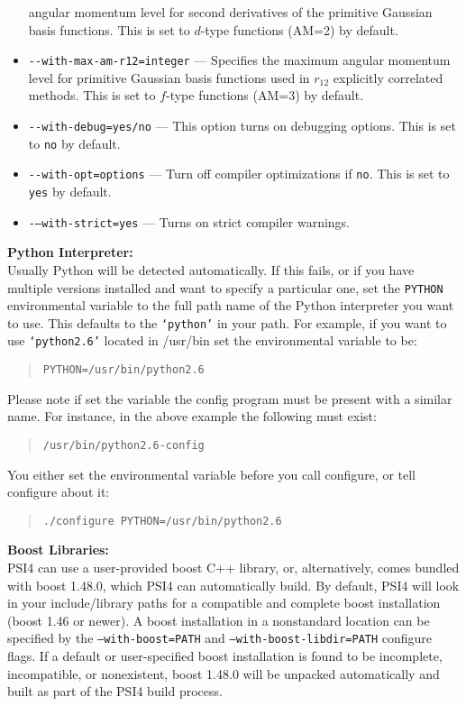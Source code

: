 \documentclass[12pt]{article}
\begin{document}
\begin{itemize}
  angular momentum level for second derivatives of the primitive
  Gaussian basis functions.  This is set to $d$-type functions (AM=2)
  by default.
\item {\tt -}{\tt -with-max-am-r12=integer} --- Specifies the maximum
  angular momentum level for primitive Gaussian basis functions used
  in $r_{12}$ explicitly correlated methods.  This is set to $f$-type
  functions (AM=3) by default.
\item {\tt -}{\tt -with-debug=yes/no} --- This option turns on debugging
  options.  This is set to {\tt no} by default.
\item {\tt -}{\tt -with-opt=options} --- Turn off compiler
  optimizations if {\tt no}.  This is set to {\tt yes} by default.
\item {\tt -}{\tt --with-strict=yes} --- Turns on strict compiler warnings.
\end{itemize}

\noindent
{\bf Python Interpreter:} \\
   Usually Python will be detected automatically.  If this fails, or if
   you have multiple versions installed and want to specify a particular
   one, set the {\tt PYTHON} environmental variable to the full path name
   of the Python interpreter you want to use.  This defaults to the
   {\tt `python'} in your path. For example, if you want to use
   {\tt `python2.6'} located in /usr/bin set the environmental variable to be:

\begin{quotation}
\noindent
      {\tt PYTHON=/usr/bin/python2.6}
\end{quotation}

   Please note if set the variable the config program must be present with
   a similar name. For instance, in the above example the following must
   exist:

\begin{quotation}
\noindent
      {\tt /usr/bin/python2.6-config}
\end{quotation}

   You either set the environmental variable before you call configure, or
   tell configure about it:

\begin{quotation}
\noindent
      {\tt ./configure PYTHON=/usr/bin/python2.6}
\end{quotation}

\noindent
{\bf Boost Libraries:} \\
   PSI4 can use a user-provided boost C++ library, or, alternatively,
   comes bundled with boost 1.48.0, which PSI4 can automatically
   build. By default, PSI4 will look in your include/library paths for
   a compatible and complete boost installation (boost 1.46 or newer). A
   boost installation in a nonstandard location can be specified by the
   {\tt --with-boost=PATH} and {\tt --with-boost-libdir=PATH} configure flags. 
   If a default or user-specified boost installation is found to be 
   incomplete, incompatible, or nonexistent, boost 1.48.0 will be unpacked
   automatically and built as part of the PSI4 build process.
\end{document}
